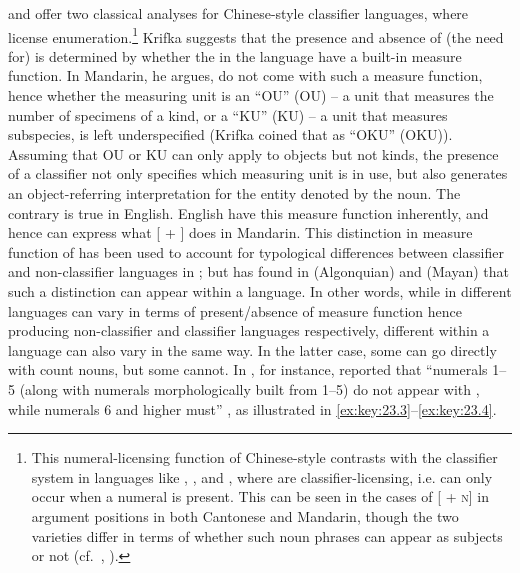 \documentclass[output=paper]{langsci/langscibook}
\begin{document}
\citet{Krifka1995} and \citet{Chierchia1998} offer two classical analyses for
Chinese-style classifier languages, where 
license enumeration.\footnote{This numeral-licensing function of Chinese-style
     contrasts with the classifier system in
    languages like  \citep{Watanabe2006}, 
    \parencite{VazquezRojasMaldonado2012}, and  \citep{Massam2009},
    where  are classifier-licensing, i.e.   can
    only occur when a numeral is present. This can be seen in the
    cases of [\Clf{} + \textsc{n}] in argument positions in both Cantonese and
    Mandarin, though the two varieties differ in terms of whether such noun
    phrases can appear as subjects or not (cf.\ \citealt{ChengSybesma1999},
\citealt{Sio2006}).} Krifka suggests that the presence and absence of (the need
for)  is determined by whether the  in the
language have a built-in measure function. In Mandarin, he argues,
 do not come with such a measure function, hence whether the
measuring unit is an \enquote{\glsdesc{OU}} (\gls{OU}) -- a unit
that measures the number of specimens of a kind, or a \enquote{\glsdesc{KU}}
(\gls{KU}) -- a unit that measures subspecies, is left
underspecified (Krifka coined that as \enquote{\glsdesc{OKU}}
(\gls{OKU})). Assuming that \gls{OU} or \gls{KU} can only apply
to objects but not kinds, the presence of a classifier not only
specifies which measuring unit is in use, but also generates an
object-referring interpretation for the entity denoted by the noun. The
contrary is true in English. English  have this measure function
inherently, and hence can express what [\Num{} + \Clf] does in
Mandarin.  This distinction in measure function of 
has been used to account for typological differences between
classifier and non-classifier languages in \citet{Krifka1995};
but \citet{BaleCoon2014} has found in  (Algonquian) and 
(Mayan) that such a distinction can appear within a language. In other words,
while  in different languages can vary in terms of
present/absence of measure function hence producing non-classifier and
classifier languages respectively, different  within a language
can also vary in the same way. In the latter case, some  can go
directly with count nouns, but some cannot. In , for instance,
\citeauthor{BaleCoon2014} reported that “numerals 1--5 (along with numerals
morphologically built from 1--5) do not appear with , while
numerals 6 and higher must” \parencite[700]{BaleCoon2014}, as illustrated in
\eqref{ex:key:23.3}--\eqref{ex:key:23.4}.
\end{document}
